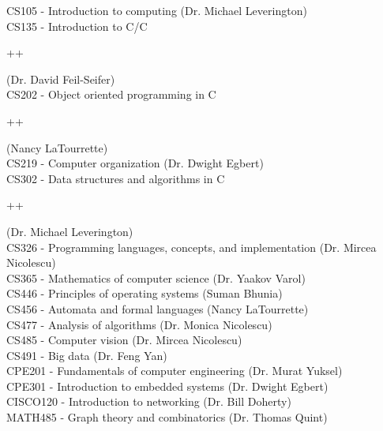 \documentclass[8pt]{paper}
\begin{document}
\begin{flushleft}
CS105 \hspace{6mm} - Introduction to computing (Dr. Michael Leverington)\\
CS135 \hspace{6mm} - Introduction to C/C\begin{small}++\end{small} (Dr. David Feil-Seifer)\\
CS202 \hspace{6mm} - Object oriented programming in C\begin{small}++\end{small} (Nancy LaTourrette)\\
CS219 \hspace{6mm} - Computer organization (Dr. Dwight Egbert)\\
CS302 \hspace{6mm} - Data structures and algorithms in C\begin{small}++\end{small} (Dr. Michael Leverington)\\
CS326 \hspace{6mm} - Programming languages, concepts, and implementation (Dr. Mircea Nicolescu)\\
CS365 \hspace{6mm} - Mathematics of computer science (Dr. Yaakov Varol)\\	
CS446 \hspace{6mm} - Principles of operating systems (Suman Bhunia)\\	
CS456 \hspace{6mm} - Automata and formal languages (Nancy LaTourrette)\\
CS477 \hspace{6mm} - Analysis of algorithms (Dr. Monica Nicolescu)\\
CS485 \hspace{6mm} - Computer vision (Dr. Mircea Nicolescu)\\
CS491 \hspace{6mm} - Big data (Dr. Feng Yan)\\
CPE201 \hspace{2.75mm} - Fundamentals of computer engineering (Dr. Murat Yuksel)\\
CPE301 \hspace{2.75mm} - Introduction to embedded systems (Dr. Dwight Egbert)\\
CISCO120 - Introduction to networking (Dr. Bill Doherty)\\
MATH485 - Graph theory and combinatorics (Dr. Thomas Quint)\\
	

\end{flushleft}
\end{document}
